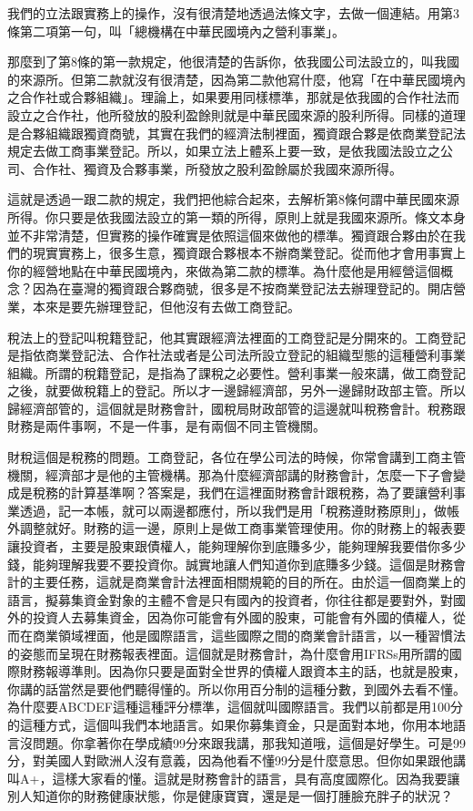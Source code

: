 \documentclass[]{ctexbook}
\begin{document}
我們的立法跟實務上的操作，沒有很清楚地透過法條文字，去做一個連結。用第3條第二項第一句，叫「總機構在中華民國境內之營利事業」。

那麼到了第8條的第一款規定，他很清楚的告訴你，依我國公司法設立的，叫我國的來源所。但第二款就沒有很清楚，因為第二款他寫什麼，他寫「在中華民國境內之合作社或合夥組織」。理論上，如果要用同樣標準，那就是依我國的合作社法而設立之合作社，他所發放的股利盈餘則就是中華民國來源的股利所得。同樣的道理是合夥組織跟獨資商號，其實在我們的經濟法制裡面，獨資跟合夥是依商業登記法規定去做工商事業登記。所以，如果立法上體系上要一致，是依我國法設立之公司、合作社、獨資及合夥事業，所發放之股利盈餘屬於我國來源所得。

這就是透過一跟二款的規定，我們把他綜合起來，去解析第8條何謂中華民國來源所得。你只要是依我國法設立的第一類的所得，原則上就是我國來源所。條文本身並不非常清楚，但實務的操作確實是依照這個來做他的標準。獨資跟合夥由於在我們的現實實務上，很多生意，獨資跟合夥根本不辦商業登記。從而他才會用事實上你的經營地點在中華民國境內，來做為第二款的標準。為什麼他是用經營這個概念？因為在臺灣的獨資跟合夥商號，很多是不按商業登記法去辦理登記的。開店營業，本來是要先辦理登記，但他沒有去做工商登記。

稅法上的登記叫稅籍登記，他其實跟經濟法裡面的工商登記是分開來的。工商登記是指依商業登記法、合作社法或者是公司法所設立登記的組織型態的這種營利事業組織。所謂的稅籍登記，是指為了課稅之必要性。營利事業一般來講，做工商登記之後，就要做稅籍上的登記。所以才一邊歸經濟部，另外一邊歸財政部主管。所以歸經濟部管的，這個就是財務會計，國稅局財政部管的這邊就叫稅務會計。稅務跟財務是兩件事啊，不是一件事，是有兩個不同主管機關。

財稅這個是稅務的問題。工商登記，各位在學公司法的時候，你常會講到工商主管機關，經濟部才是他的主管機構。那為什麼經濟部講的財務會計，怎麼一下子會變成是稅務的計算基準啊？答案是，我們在這裡面財務會計跟稅務，為了要讓營利事業透過，記一本帳，就可以兩邊都應付，所以我們是用「稅務遵財務原則」，做帳外調整就好。財務的這一邊，原則上是做工商事業管理使用。你的財務上的報表要讓投資者，主要是股東跟債權人，能夠理解你到底賺多少，能夠理解我要借你多少錢，能夠理解我要不要投資你。誠實地讓人們知道你到底賺多少錢。這個是財務會計的主要任務，這就是商業會計法裡面相關規範的目的所在。由於這一個商業上的語言，擬募集資金對象的主體不會是只有國內的投資者，你往往都是要對外，對國外的投資人去募集資金，因為你可能會有外國的股東，可能會有外國的債權人，從而在商業領域裡面，他是國際語言，這些國際之間的商業會計語言，以一種習慣法的姿態而呈現在財務報表裡面。這個就是財務會計，為什麼會用IFRSs用所謂的國際財務報導準則。因為你只要是面對全世界的債權人跟資本主的話，也就是股東，你講的話當然是要他們聽得懂的。所以你用百分制的這種分數，到國外去看不懂。為什麼要ABCDEF這種這種評分標準，這個就叫國際語言。我們以前都是用100分的這種方式，這個叫我們本地語言。如果你募集資金，只是面對本地，你用本地語言沒問題。你拿著你在學成績99分來跟我講，那我知道哦，這個是好學生。可是99分，對美國人對歐洲人沒有意義，因為他看不懂99分是什麼意思。但你如果跟他講叫A+，這樣大家看的懂。這就是財務會計的語言，具有高度國際化。因為我要讓別人知道你的財務健康狀態，你是健康寶寶，還是是一個打腫臉充胖子的狀況？
\end{document}
